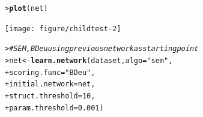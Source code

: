 \documentclass{article}\usepackage[]{graphicx}\usepackage[]{color}
\makeatletter
\newcommand{\hlnum}[1]{\textcolor[rgb]{0.686,0.059,0.569}{#1}}%
\newcommand{\hlstr}[1]{\textcolor[rgb]{0.192,0.494,0.8}{#1}}%
\newcommand{\hlcom}[1]{\textcolor[rgb]{0.678,0.584,0.686}{\textit{#1}}}%
\newcommand{\hlstd}[1]{\textcolor[rgb]{0.345,0.345,0.345}{#1}}%
\newcommand{\hlkwb}[1]{\textcolor[rgb]{0.69,0.353,0.396}{#1}}%
\newcommand{\hlkwc}[1]{\textcolor[rgb]{0.333,0.667,0.333}{#1}}%
\newcommand{\hlkwd}[1]{\textcolor[rgb]{0.737,0.353,0.396}{\textbf{#1}}}%
\newenvironment{kframe}{%
 \def\at@end@of@kframe{}%
 \ifinner\ifhmode%
  \def\at@end@of@kframe{\end{minipage}}%
  \begin{minipage}{\columnwidth}%
 \fi\fi%
 \def\FrameCommand##1{\hskip\@totalleftmargin \hskip-\fboxsep
 \colorbox{shadecolor}{##1}\hskip-\fboxsep
     \hskip-\linewidth \hskip-\@totalleftmargin \hskip\columnwidth}%
 \MakeFramed {\advance\hsize-\width
   \@totalleftmargin\z@ \linewidth\hsize
   \@setminipage}}%
 {\par\unskip\endMakeFramed%
 \at@end@of@kframe}
\newenvironment{knitrout}{}{} %
\makeatother
\begin{document}
\begin{knitrout}
\begin{kframe}
{\ttfamily\noindent\itshape\color{messagecolor}{bnstruct :: learning the structure using MMHC ...\\bnstruct :: learning using MMHC completed.\\bnstruct :: learning network parameters ... \\bnstruct :: parameter learning done.}}\begin{alltt}
\hlstd{> }\hlkwd{plot}\hlstd{(net)}
\end{alltt}
\end{kframe}
\texttt{[image: figure/childtest-2]} 
\begin{kframe}\begin{alltt}
\hlstd{> }\hlcom{# SEM, BDeu using previous network as starting point}
\hlstd{> }\hlstd{net} \hlkwb{<-} \hlkwd{learn.network}\hlstd{(dataset,} \hlkwc{algo} \hlstd{=} \hlstr{"sem"}\hlstd{,}
\hlstd{+ }                     \hlkwc{scoring.func} \hlstd{=} \hlstr{"BDeu"}\hlstd{,}
\hlstd{+ }                     \hlkwc{initial.network} \hlstd{= net,}
\hlstd{+ }                     \hlkwc{struct.threshold} \hlstd{=} \hlnum{10}\hlstd{,}
\hlstd{+ }                     \hlkwc{param.threshold} \hlstd{=} \hlnum{0.001}\hlstd{)}
\end{alltt}



\end{kframe}
\end{knitrout}
\end{document}
